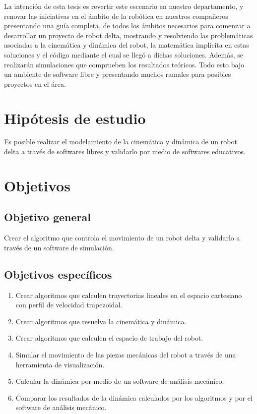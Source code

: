La intención de esta tesis es revertir este escenario en nuestro departamento, y renovar las iniciativas en el ámbito de la robótica en nuestros compañeros presentando una guía completa, de todos los ámbitos necesarios para comenzar a desarrollar un proyecto de robot delta, mostrando y resolviendo las problemáticas asociadas a la cinemática y dinámica del robot, la matemática implícita en estas soluciones y el código mediante el cual se llegó a dichas soluciones. Además, se realizarán simulaciones que comprueben los resultados teóricos. Todo esto bajo un ambiente de software libre y presentando muchos ramales para posibles proyectos en el área.

\section{Hipótesis de estudio}
Es posible realizar el modelamiento de la cinemática y dinámica de un robot delta a través de softwares libres y validarlo por medio de softwares educativos.

\section{Objetivos}

    \subsection{Objetivo general}
        Crear el algoritmo que controla el movimiento de un robot delta y validarlo a través de un software de simulación.
\subsection{Objetivos específicos}
\begin{enumerate}
    \item {Crear algoritmos que calculen trayectorias lineales en el espacio cartesiano con perfil de velocidad trapezoidal.}
    \item {Crear algoritmos que resuelva la cinemática y dinámica.}
    \item {Crear algoritmos que calculen el espacio de trabajo del robot.}
    \item {Simular el movimiento de las piezas mecánicas del robot a través de una herramienta de visualización.}
    \item {Calcular la dinámica por medio de un software de análisis mecánico.}
    \item {Comparar los resultados de la dinámica calculados por los algoritmos y por el software de análisis mecánico. }
\end{enumerate}

